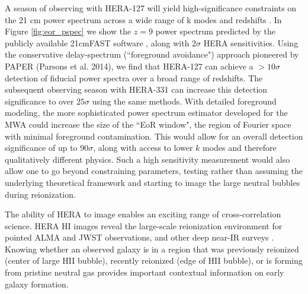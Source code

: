 \documentclass[ars]{copernicus}
\begin{document}
A season of observing with HERA-127 will yield high-significance constraints on the
21 cm power spectrum across a wide range of k modes and redshifts
\citep{pober_et_al2014}. In Figure \ref{fig:eor_pspec} we show the $z=9$ power
spectrum predicted by the publicly available 21cmFAST software
\citep{mesinger_et_al2011}, along with $2\sigma$ HERA sensitivities. Using the
conservative delay-spectrum (``foreground avoidance") approach pioneered by PAPER
(Parsons et al. 2014), we find that HERA-127 can achieve a $> 10\sigma$ detection of
fiducial power spectra over a broad range of redshifts. The subsequent observing
season with HERA-331 can increase this detection significance to over $25\sigma$
using the same methods. With detailed foreground modeling, the more sophisticated
power spectrum estimator developed for the MWA could increase the size of the ``EoR
window", the region of Fourier space with minimal foreground contamination. This
would allow for an overall detection significance of up to $90\sigma$, along with
access to lower $k$ modes and therefore qualitatively different physics. Such a high
sensitivity measurement would also allow one to go beyond constraining parameters,
testing rather than assuming the underlying theoretical framework and starting to
image the large neutral bubbles during reionization.

%

The ability of HERA to image enables an exciting range of cross-correlation science.
HERA HI images reveal the large-scale reionization environment for pointed ALMA and
JWST observations, and other deep near-IR surveys \citep{lidz_et_al2009}. Knowing
whether an observed galaxy is in a region that was previously reionized (center of
large HII bubble), recently reionized (edge of HII bubble), or is forming from
pristine neutral gas provides important contextual information on early galaxy
formation.
\end{document}
